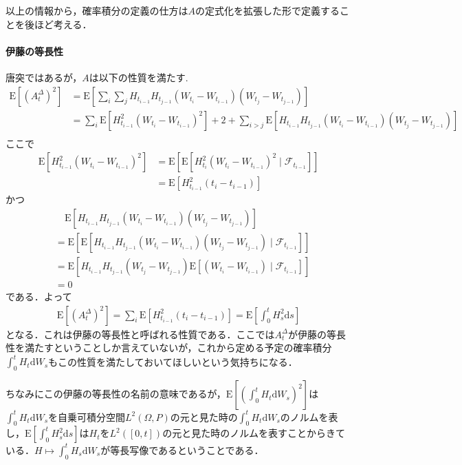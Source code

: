 \documentclass{jsarticle}
\theoremstyle{definition}
\begin{document}
以上の情報から，確率積分の定義の仕方は$A$の定式化を拡張した形で定義することを後ほど考える．

\paragraph{伊藤の等長性}
唐突ではあるが，$A$は以下の性質を満たす.
\begin{align*}
    \mathrm{E}\left[(A_t^\Delta)^2\right] &= \mathrm{E}\left[\sum_{i}\sum_{j} H_{t_{i-1}}H_{t_{j-1}}(W_{t_i}-W_{t_{i-1}}) (W_{t_j} - W_{t_{j-1}})\right]\\
    &= \sum_{i}\mathrm{E}\left[H_{t_{i-1}}^2(W_{t_i} - W_{t_{i-1}})^2\right] + 2 + \sum_{i>j}\mathrm{E}\left[H_{t_{i-1}}H_{t_{j-1}}(W_{t_i}-W_{t_{i-1}}) (W_{t_j} - W_{t_{j-1}})\right]\\
\end{align*}
ここで
\begin{align*}
    \mathrm{E}\left[H_{t_{i-1}}^2(W_{t_i} - W_{t_{i-1}})^2\right] &= \mathrm{E}\left[\mathrm{E}\left[H_{t_i}^2(W_{t_i} - W_{t_{i-1}})^2\mid \mathscr{F}_{t_{i-1}}\right]\right]\\
    &= \mathrm{E}\left[H_{t_{i-1}}^2(t_i - t_{i-1})\right]
\end{align*}
かつ
\begin{align*}
    &\quad\mathrm{E}\left[H_{t_{i-1}}H_{t_{j-1}}(W_{t_i}-W_{t_{i-1}}) (W_{t_j} - W_{t_{j-1}})\right] \\
    &= \mathrm{E}\left[\mathrm{E}\left[H_{t_{i-1}}H_{t_{j-1}}(W_{t_i}-W_{t_{i-1}}) (W_{t_j} - W_{t_{j-1}})\mid \mathscr{F}_{t_{i-1}}\right]\right]\\
    &= \mathrm{E}\left[H_{t_{i-1}}H_{t_{j-1}} (W_{t_j} - W_{t_{j-1}})\mathrm{E}\left[(W_{t_i}-W_{t_{i-1}})\mid \mathscr{F}_{t_{i-1}}\right]\right]\\
    &= 0
\end{align*}
である．よって
\begin{align*}
    \mathrm{E}\left[(A_t^\Delta)^2\right] = \sum_{i}\mathrm{E}\left[H_{t_{i-1}}^2(t_i - t_{i-1})\right] = \mathrm{E}\left[\int_0^t H^2_s \mathrm{d}s\right]
\end{align*}
となる．これは伊藤の等長性と呼ばれる性質である．ここでは$A_t^\Delta$が伊藤の等長性を満たすということしか言えていないが，これから定める予定の確率積分$\int_0^t H_t\mathrm{d}W_s$もこの性質を満たしておいてほしいという気持ちになる．\par
ちなみにこの伊藤の等長性の名前の意味であるが，$\mathrm{E}\left[\left(\int_0^t H_t\mathrm{d}W_s\right)^2\right]$は$\int_0^t H_t\mathrm{d}W_s$を自乗可積分空間$L^2(\Omega, P)$の元と見た時の$\int_0^t H_t\mathrm{d}W_s$のノルムを表し，$\mathrm{E}\left[\int_0^t H^2_s \mathrm{d}s\right]$は$H_t$を$L^2([0, t])$の元と見た時のノルムを表すことからきている．$H\mapsto \int_0^t H_s\mathrm{d}W_s$が等長写像であるということである．
\end{document}
